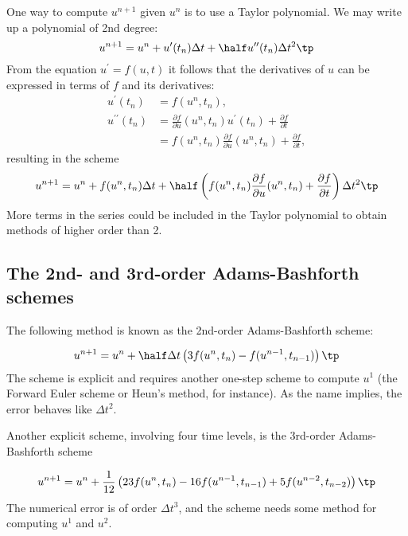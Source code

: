 \documentclass[graybox,sectrefs,envcountresetchap,open=right,final]{svmonodo}
\begin{document}

One way to compute $u^{n+1}$ given $u^n$ is to use a Taylor polynomial.
We may write up a polynomial of 2nd degree:
\[
u^{n+1} = u^n + u^{\prime}(t_n)\Delta t + {\half}u^{\prime\prime}(t_n)\Delta t^2
\tp
\]
From the equation $u^{\prime}=f(u,t)$ it follows that the derivatives of $u$
can be expressed in terms of $f$ and its derivatives:
\begin{align*}
u^{\prime}(t_n) &=f(u^n,t_n),\\ 
u^{\prime\prime}(t_n) &=
\frac{\partial f}{\partial u}(u^n,t_n) u^{\prime}(t_n) + \frac{\partial f}{\partial t}\\ 
&=  f(u^n,t_n)\frac{\partial f}{\partial u}(u^n,t_n)  +
\frac{\partial f}{\partial t},
\end{align*}
resulting in the scheme
\begin{equation}
u^{n+1} = u^n + f(u^n,t_n)\Delta t + \half\left(
f(u^n,t_n)\frac{\partial f}{\partial u}(u^n,t_n)  +
\frac{\partial f}{\partial t}\right)\Delta t^2
\tp
\label{decay:fd2:Taylor2}
\end{equation}
More terms in the series could be included in the Taylor polynomial to
obtain methods of higher order than 2.



\subsection{The 2nd- and 3rd-order Adams-Bashforth schemes}


The following method is known as the 2nd-order Adams-Bashforth scheme:

\begin{equation}
u^{n+1} = u^n + \half\Delta t\left( 3f(u^n, t_n) - f(u^{n-1}, t_{n-1})
\right)
\tp
\label{decay:fd2:AB2}
\end{equation}
The scheme is explicit and requires another one-step scheme to compute
$u^1$ (the Forward Euler scheme or Heun's method, for instance).
As the name implies, the error behaves like $\Delta t^2$.



Another explicit scheme, involving four time levels, is the
3rd-order Adams-Bashforth scheme

\begin{equation}
u^{n+1} = u^n + \frac{1}{12}\left( 23f(u^n, t_n) - 16 f(u^{n-1},t_{n-1})
+ 5f(u^{n-2}, t_{n-2})\right)
\tp
\label{decay:fd2:AB3}
\end{equation}
The numerical error is of order $\Delta t^3$, and the scheme needs
some method for computing $u^1$ and $u^2$.
\end{document}
